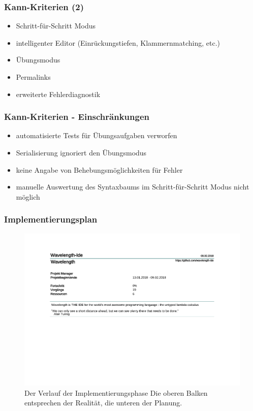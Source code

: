 \documentclass[10pt]{beamer}
\begin{document}
\begin{frame}
\frametitle{Kann-Kriterien (2)}
\begin{itemize}
\item Schritt-für-Schritt Modus
\item intelligenter Editor (Einrückungstiefen, Klammernmatching, etc.)
\item Übungsmodus
\item Permalinks
\item erweiterte Fehlerdiagnostik
\end{itemize}
\end{frame}

\begin{frame}
\frametitle{Kann-Kriterien - \alert{Einschränkungen}}
\begin{itemize}
\item automatisierte Tests für Übungsaufgaben verworfen
\item Serialisierung ignoriert den Übungsmodus
\item keine Angabe von Behebungsmöglichkeiten für Fehler
\item manuelle Auswertung des Syntaxbaums im Schritt-für-Schritt Modus nicht möglich
\end{itemize}
\end{frame}

\begin{frame}
\frametitle{Implementierungsplan}
\begin{figure}[h]
\includegraphics[trim={0, 7cm, 0, 0}, clip, scale=0.4, page=4]{Implementierungsplan/Implementierungsplan.pdf}
\caption[caption]{Der Verlauf der Implementierungsphase 
\newline
Die oberen Balken entsprechen der Realität, die unteren der Planung.}
\end{figure}
\end{frame}
\end{document}
